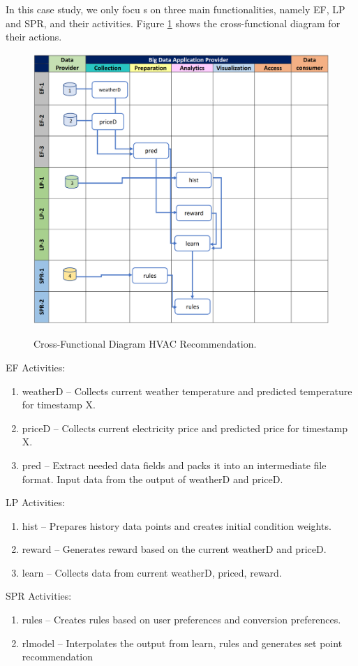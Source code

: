 In this case study, we only focu s on three main functionalities, namely EF, LP and SPR, and their
activities. Figure \ref{fig:hvac} shows the cross-functional diagram for their actions.



\begin{figure}[htb]
\includegraphics[width=1.0\textwidth]{usecase/hvac-2.png}
\label{fig:hvac}
\caption{Cross-Functional Diagram HVAC Recommendation.}
\end{figure}


EF Activities:

\begin{enumerate}
\item weatherD – Collects current weather temperature and predicted temperature for timestamp
X.
\item priceD – Collects current electricity price and predicted price for timestamp X.
\item pred – Extract needed data fields and packs it into an intermediate file format. Input data
from the output of weatherD and priceD.
\end{enumerate}


LP Activities:

\begin{enumerate}
\item hist – Prepares history data points and creates initial condition weights.
\item reward – Generates reward based on the current weatherD and priceD.
\item learn – Collects data from current weatherD, priced, reward.
\end{enumerate}

SPR Activities:

\begin{enumerate}
\item rules – Creates rules based on user preferences and conversion preferences.
\item rlmodel – Interpolates the output from learn, rules and generates set point recommendation
\end{enumerate}

